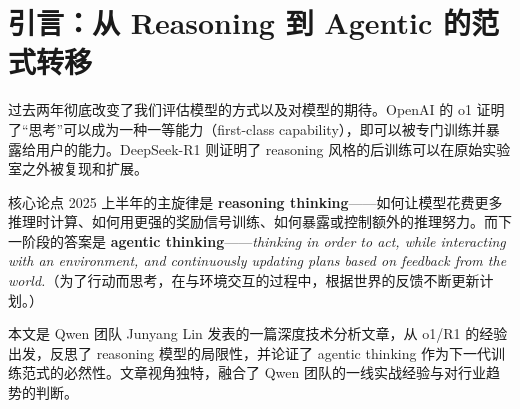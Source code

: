 \section{引言：从 Reasoning 到 Agentic 的范式转移}

过去两年彻底改变了我们评估模型的方式以及对模型的期待。OpenAI 的 o1 证明了``思考''可以成为一种一等能力（first-class capability），即可以被专门训练并暴露给用户的能力。DeepSeek-R1 则证明了 reasoning 风格的后训练可以在原始实验室之外被复现和扩展。

\begin{importantbox}{核心论点}
2025 上半年的主旋律是 \textbf{reasoning thinking}——如何让模型花费更多推理时计算、如何用更强的奖励信号训练、如何暴露或控制额外的推理努力。而下一阶段的答案是 \textbf{agentic thinking}——\textit{thinking in order to act, while interacting with an environment, and continuously updating plans based on feedback from the world.}（为了行动而思考，在与环境交互的过程中，根据世界的反馈不断更新计划。）
\end{importantbox}

本文是 Qwen 团队 Junyang Lin 发表的一篇深度技术分析文章，从 o1/R1 的经验出发，反思了 reasoning 模型的局限性，并论证了 agentic thinking 作为下一代训练范式的必然性。文章视角独特，融合了 Qwen 团队的一线实战经验与对行业趋势的判断。


